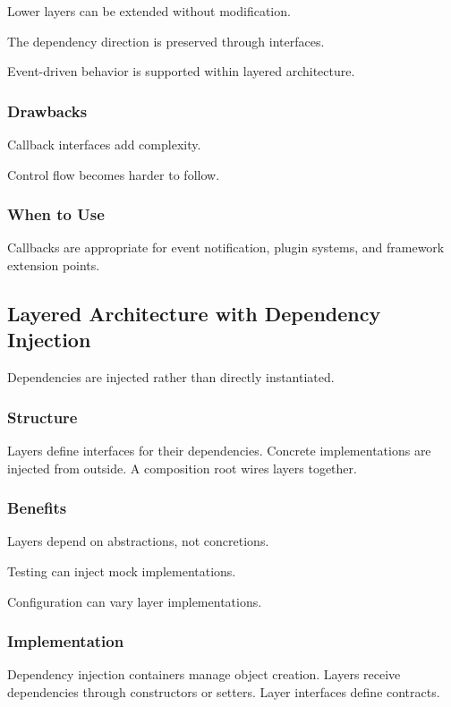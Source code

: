 \documentclass[11pt]{article}
\begin{document}
Lower layers can be extended without modification.

The dependency direction is preserved through interfaces.

Event-driven behavior is supported within layered architecture.

\subsubsection{Drawbacks}

Callback interfaces add complexity.

Control flow becomes harder to follow.

\subsubsection{When to Use}

Callbacks are appropriate for event notification, plugin systems, and framework extension points.

\subsection{Layered Architecture with Dependency Injection}

Dependencies are injected rather than directly instantiated.

\subsubsection{Structure}

Layers define interfaces for their dependencies. Concrete implementations are injected from outside. A composition root wires layers together.

\subsubsection{Benefits}

Layers depend on abstractions, not concretions.

Testing can inject mock implementations.

Configuration can vary layer implementations.

\subsubsection{Implementation}

Dependency injection containers manage object creation. Layers receive dependencies through constructors or setters. Layer interfaces define contracts.
\end{document}
